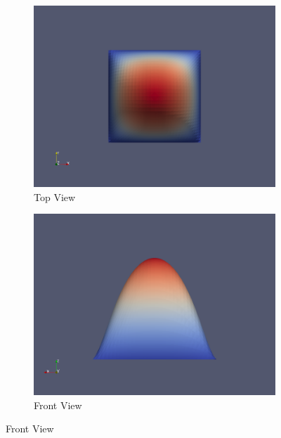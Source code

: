 \documentclass[12pt, a4paper]{article}
\numberwithin{equation}{section} %
\begin{document}
\begin{figure}[htbp]
    \centering
    \begin{subfigure}{0.48\textwidth}
        \centering
        \includegraphics[width=\textwidth]{proj1.png}
        \caption{Top View}
        \label{fig:front_view}
    \end{subfigure}
    \hfill
    \begin{subfigure}{0.48\textwidth}
        \centering
        \includegraphics[width=\textwidth]{proj2.png}
        \caption{Front View}
        \label{fig:top_view}
    \end{subfigure}
    
    \vspace{1cm} %
    

\end{figure}
\end{document}
